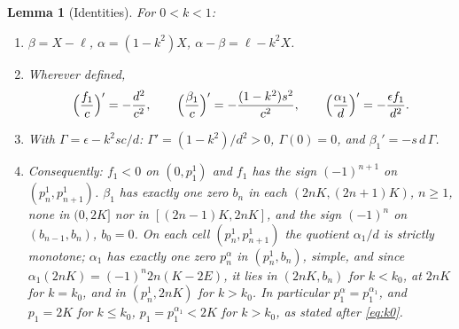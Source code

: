 \documentclass[11pt]{article}
\newtheorem{lemma}[theorem]{Lemma}
\theoremstyle{remark}
\begin{document}
\begin{lemma}[Identities]\label{lem:identities}
For $0<k<1$:
\begin{enumerate}[label=(\roman*),nosep,leftmargin=*]
\item $\beta=X-\ell$, $\alpha=(1-k^2)X$, $\alpha-\beta=\ell-k^2X$.
\item Wherever defined,
 \[
  \Bigl(\frac{f_1}{c}\Bigr)'=-\frac{d^2}{c^2},\qquad
  \Bigl(\frac{\beta_1}{c}\Bigr)'=-\frac{(1-k^2)s^2}{c^2},\qquad
  \Bigl(\frac{\alpha_1}{d}\Bigr)'=-\frac{\epsilon f_1}{d^2}.
 \]
\item With $\Gamma=\epsilon-k^2sc/d$: $\Gamma'=(1-k^2)/d^2>0$, $\Gamma(0)=0$,
 and $\beta_1'=-s\,d\,\Gamma$.
\item Consequently: $f_1<0$ on $(0,p_1^1)$ and $f_1$ has the sign
 $(-1)^{n+1}$ on $(p_n^1,p_{n+1}^1)$.  $\beta_1$ has exactly one zero $b_n$
 in each $(2nK,(2n+1)K)$, $n\ge1$, none in $(0,2K]$ nor in
 $[(2n-1)K,2nK]$, and the sign $(-1)^n$ on $(b_{n-1},b_n)$, $b_0=0$.
 On each cell $(p_n^1,p_{n+1}^1)$ the quotient
 $\alpha_1/d$ is strictly monotone; $\alpha_1$ has exactly one zero
 $p_n^\alpha$ in $(p_n^1,b_n)$, simple, and since
 $\alpha_1(2nK)=(-1)^n2n(K-2E)$, it lies in $(2nK,b_n)$ for $k<k_0$, at
 $2nK$ for $k=k_0$, and in $(p_n^1,2nK)$ for $k>k_0$.  In particular
 $p_1^\alpha=p_1^{\alpha_1}$, and $p_1=2K$ for $k\le k_0$, $p_1=p_1^{\alpha_1}<2K$
 for $k>k_0$, as stated after \eqref{eq:k0}.
\end{enumerate}
\end{lemma}
\end{document}
